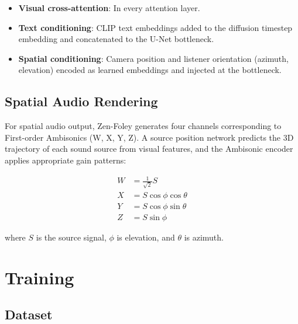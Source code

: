 \documentclass[11pt,a4paper]{article}
\begin{document}
\begin{itemize}
    \item \textbf{Visual cross-attention}: In every attention layer.
    \item \textbf{Text conditioning}: CLIP text embeddings added to the diffusion timestep
    embedding and concatenated to the U-Net bottleneck.
    \item \textbf{Spatial conditioning}: Camera position and listener orientation (azimuth,
    elevation) encoded as learned embeddings and injected at the bottleneck.
\end{itemize}

\subsection{Spatial Audio Rendering}

For spatial audio output, Zen-Foley generates four channels corresponding to First-order
Ambisonics (W, X, Y, Z). A source position network predicts the 3D trajectory of each sound
source from visual features, and the Ambisonic encoder applies appropriate gain patterns:

\begin{align}
    W &= \frac{1}{\sqrt{2}} S \\
    X &= S \cos\phi \cos\theta \\
    Y &= S \cos\phi \sin\theta \\
    Z &= S \sin\phi
\end{align}

where $S$ is the source signal, $\phi$ is elevation, and $\theta$ is azimuth.

\section{Training}

\subsection{Dataset}
\end{document}
